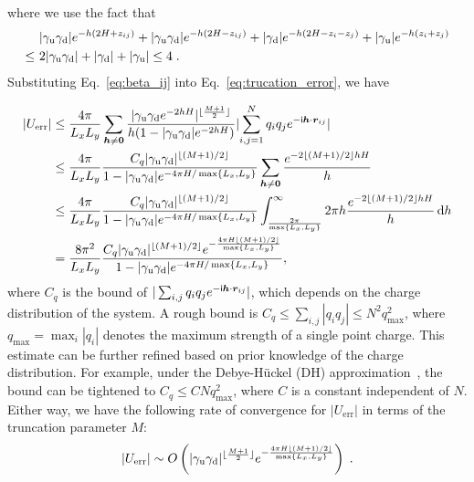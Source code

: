 where we use the fact that 
\begin{equation}
    \begin{split}
        & ~ \lvert\gamma_{\text{u}} \gamma_{\text{d}}\rvert e^{-h(2 H + z_{ij})} + \lvert\gamma_{\text{u}} \gamma_{\text{d}}\rvert e^{ - h (2 H - z_{ij})} + \lvert\gamma_{\text{d}}\rvert e^{- h (2 H - z_i - z_j)} + \lvert\gamma_{\text{u}}\rvert e^{- h (z_i + z_j)} \\
        \leq & ~ 2 \lvert\gamma_{\text{u}} \gamma_{\text{d}}\rvert +\lvert\gamma_{\text{d}}\rvert + \lvert\gamma_{\text{u}}\rvert \leq 4 \;.
    \end{split}
\end{equation}
Substituting Eq.~\eqref{eq:beta_ij} into Eq.~\eqref{eq:trucation_error}, we have

\begin{equation}\label{eq:U_gamma_bound}
    \begin{split}
        \left|U_{\text{err}}\right| & \leq \frac{4 \pi}{L_x L_y}  \sum_{\bm{h}\neq \bm{0}}  \frac{\lvert\gamma_{\text{u}} \gamma_{\text{d}} e^{- 2 hH}\rvert^{\lfloor \frac{M + 1}{2} \rfloor}}{h(1 - \lvert\gamma_{\text{u}} \gamma_{\text{d}}\rvert e^{- 2hH})}\lvert\sum_{i,j=1}^{N}q_i q_j e^{-\mathsf i \bm{h}\cdot\bm{r}_{ij}}\rvert \\
        & \leq \frac{4\pi}{L_x L_y} \frac{C_{q} \lvert\gamma_{\text{u}} \gamma_{\text{d}}\rvert^{\lfloor{(M+1)/2}\rfloor}}{1 - \lvert\gamma_{\text{u}} \gamma_{\text{d}}\rvert e^{- 4\pi H / \max\{L_x,L_y\}}} \sum_{\bm{h}\neq \bm{0}} \frac{e^{- 2 \lfloor{(M+1)/2}\rfloor hH}}{h}\\
        & \leq \frac{4\pi}{L_x L_y} \frac{C_{q} \lvert\gamma_{\text{u}} \gamma_{\text{d}}\rvert^{\lfloor{(M+1)/2}\rfloor}}{1 - \lvert\gamma_{\text{u}} \gamma_{\text{d}}\rvert e^{- 4\pi H / \max\{L_x,L_y\}}} \int_{\frac{2\pi}{\max\{L_x,L_y\}}}^{\infty} 2\pi h \frac{e^{- 2 \lfloor{(M+1)/2}\rfloor hH}}{h} \, \mathrm{d}h \\
        & = \frac{8 \pi^2}{L_x L_y} \frac{C_{q} \lvert\gamma_{\text{u}} \gamma_{\text{d}}\rvert^{\lfloor{(M+1)/2}\rfloor} e^{-\frac{4 \pi H \lfloor{(M+1)/2}\rfloor}{\max\{L_x,L_y\}}}}{1 - \lvert\gamma_{\text{u}} \gamma_{\text{d}}\rvert e^{- 4\pi H / \max\{L_x,L_y\}}},
    \end{split}
\end{equation}
where $C_q$ is the bound of $|\sum_{i,j}q_iq_je^{-\mathsf i \bm{h}\cdot\bm{r}_{ij}}|$, which depends on the charge distribution of the system. 
A rough bound is $C_q\leq \sum_{i,j}|q_iq_j|\leq N^2q_{\text{max}}^2$, where $q_{\text{max}}=\max_{i}|q_i|$ denotes the maximum strength of a single point charge. 
This estimate can be further refined based on prior knowledge of the charge distribution. 
For example, under the Debye-H\"uckel (DH) approximation~\cite{levin2002electrostatic,gan2024fast}, the bound can be tightened to $C_q\leq CNq_{\max}^2$, where $C$ is a constant independent of $N$. 
Either way, we have the following rate of convergence for $|U_{\text{err}}|$ in terms of the truncation parameter $M$:
\begin{equation}\label{eq:Uerr}
|U_{\text{err}}|\sim O\left(\lvert\gamma_{\text{u}} \gamma_{\text{d}}\rvert^{\lfloor\frac{M+1}{2}\rfloor} e^{-\frac{4 \pi H \lfloor (M + 1)/2\rfloor}{\max\{L_x,L_y\}}}\right)\;.
\end{equation}


